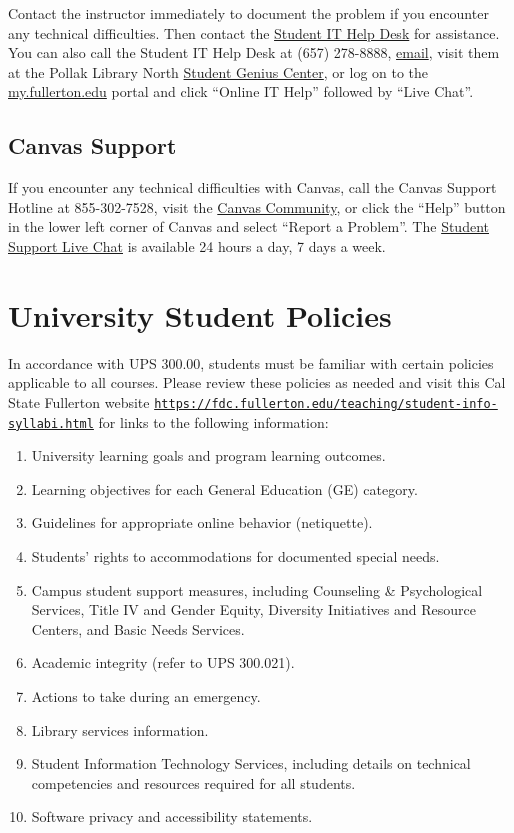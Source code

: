 \documentclass[12pt, letterpaper]{article}
\begin{document}
Contact the instructor immediately to document the problem if you encounter any technical difficulties. Then contact the \href{http://www.fullerton.edu/it/students/helpdesk/index.php}{Student IT Help Desk} for assistance. You can also call the Student IT Help Desk at (657) 278-8888, \href{mailto:StudentITHelpDesk@fullerton.edu}{email}, visit them at the Pollak Library North \href{http://www.fullerton.edu/it/students/sgc/index.php}{Student Genius Center}, or log on to the \href{http://my.fullerton.edu/}{my.fullerton.edu} portal and click ``Online IT Help'' followed by ``Live Chat''.

\subsection*{Canvas Support}

If you encounter any technical difficulties with Canvas, call the Canvas Support Hotline at 855-302-7528, visit the \href{https://community.canvaslms.com/docs/DOC-10720-67952720329}{Canvas Community}, or click the ``Help'' button in the lower left corner of Canvas and select ``Report a Problem''. The \href{https://cases.canvaslms.com/liveagentchat?chattype=student&sfid=001A000000YzcwQIAR}{Student Support Live Chat} is available 24 hours a day, 7 days a week.


\section{University Student Policies}

In accordance with UPS 300.00, students must be familiar with certain policies applicable to all courses. Please review these policies as needed and visit this Cal State Fullerton website \texttt{\href{https://fdc.fullerton.edu/teaching/student-info-syllabi.html}{https://fdc.fullerton.edu/teaching/student-info-syllabi.html}} for links to the following information:

\begin{enumerate}
    \item   University learning goals and program learning outcomes.
    \item	Learning objectives for each General Education (GE) category.
    \item	Guidelines for appropriate online behavior (netiquette).
    \item	Students’ rights to accommodations for documented special needs.
    \item   Campus student support measures, including Counseling \& Psychological Services, Title IV and Gender Equity, Diversity Initiatives and Resource Centers, and Basic Needs Services.
    \item	Academic integrity (refer to UPS 300.021).
    \item	Actions to take during an emergency.
    \item	Library services information.
    \item	Student Information Technology Services, including details on technical competencies and resources required for all students.
    \item	Software privacy and accessibility statements.
\end{enumerate}
\end{document}

